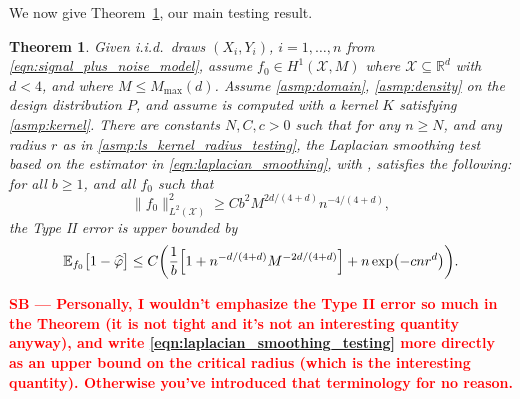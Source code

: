 \documentclass[twoside]{article}
\newcommand{\red}[1]{\textcolor{red}{#1}}
\newcommand{\sbcomment}[1]{{\bf{{\red{{SB --- #1}}}}}}
\newcommand{\Reals}{\mathbb{R}}
\newcommand{\1}{\mathbf{1}}
\newcommand{\Rd}{\Reals^d}
\newcommand{\Xset}{\mathcal{X}}
\newcommand{\Leb}{L}
\newcommand{\Ebb}{\mathbb{E}}
\newcommand{\wh}[1]{\widehat{#1}}
\newtheorem{theorem}{Theorem}
\theoremstyle{definition}
\theoremstyle{remark}
\begin{document}
We now give Theorem~\ref{thm:laplacian_smoothing_testing}, our main testing result.
\begin{theorem}
	\label{thm:laplacian_smoothing_testing}
	Given i.i.d.\ draws $(X_i,Y_i)$, $i=1,\ldots,n$ from \eqref{eqn:signal_plus_noise_model}, assume $f_0 \in H^1(\Xset,M)$ where $\Xset \subseteq \Rd$ with $d < 4$, and where $M \leq M_{\max}(d)$. Assume \ref{asmp:domain}, \ref{asmp:density} on the design distribution $P$, and assume  is computed with a kernel $K$ satisfying \ref{asmp:kernel}. There are constants $N,C,c>0$ such that for any $n \geq N$, and any radius $r$ as in \ref{asmp:ls_kernel_radius_testing}, the Laplacian smoothing test \smash{$\wh{\varphi}$} based on the estimator \smash{$\wh{f}$} in \eqref{eqn:laplacian_smoothing}, with , satisfies the following: for all $b \geq 1$, and all $f_0$ such that
	\begin{equation}
	\label{eqn:laplacian_smoothing_testing}
	\bigl\|f_0\bigr\|_{\Leb^2(\Xset)}^2 \geq C b^2 M^{2d/(4 + d)} n^{-4/(4 + d)},
	\end{equation} 
	the Type II error is upper bounded by
	\begin{equation*}
	\Ebb_{f_0}\bigl[1 - \wh{\varphi} \bigr] \leq C\biggl(\frac{1}{b}\Bigl[1 + n^{-d/(4 + d)}M^{-2d/(4 + d)}\Bigr] + n\exp\bigl(-cnr^d\bigr)\biggr).
	\end{equation*}
\end{theorem}
\sbcomment{Personally, I wouldn't emphasize the Type II error so much in the Theorem (it is not tight and it's not an interesting quantity anyway), and write \eqref{eqn:laplacian_smoothing_testing} more directly as an upper bound on the critical radius (which is the interesting quantity). Otherwise you've introduced that terminology for no reason.}
\end{document}
